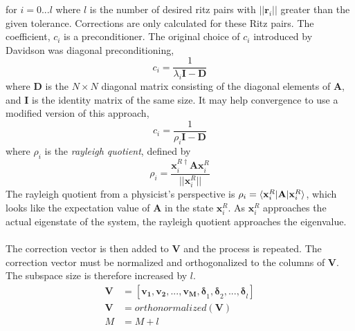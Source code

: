 \documentclass{revtex4}
\begin{document}
for $i =0...l$ where $l$ is the number of desired ritz pairs with $||\mathbf{r}_i||$ greater than the given tolerance. Corrections are only calculated for these Ritz pairs. The coefficient, $c_i$ is a preconditioner. The original choice of $c_i$ introduced by Davidson\cite{Davidson1975} was diagonal preconditioning, 
\begin{equation}
c_i = \frac{1}{\lambda_i\mathbf{I}-\mathbf{D}}
\end{equation}
where $\mathbf{D}$ is the $N\times N$ diagonal matrix consisting of the diagonal elements of $\mathbf{A}$, and $\mathbf{I}$ is the identity matrix of the same size. It may help convergence to use a modified version of this approach, 
\begin{equation}
c_i = \frac{1}{\rho_i\mathbf{I}-\mathbf{D}}
\end{equation}
where $\rho_i$ is the \emph{rayleigh quotient}, defined by
\begin{equation}
\rho_i = \frac{\mathbf{x}_i^{R\dag}\mathbf{A}\mathbf{x}_i^{R}}{||\mathbf{x}_i^{R}||}
\end{equation}
The rayleigh quotient from a physicist's perspective is $\rho_i = \braket{\mathbf{x}_i^{R}|\mathbf{A}|\mathbf{x}_i^{R}}$, which looks like the expectation value of $\mathbf{A}$ in the state $\mathbf{x}_i^{R}$. As $\mathbf{x}_i^{R}$ approaches the actual eigenstate of the system, the rayleigh quotient approaches the eigenvalue.
\\\\
The correction vector is then added to $\mathbf{V}$ and the process is repeated. The correction vector must be normalized and orthogonalized to the columns of $\mathbf{V}$. The subspace size is therefore increased by $l$. 
\begin{subequations}
\begin{align}
\mathbf{V} &= [\mathbf{v_1,v_2,...,v_M}\mathbf{,\delta}_1\mathbf{,\delta}_2,...\mathbf{,\delta}_l] \\
\mathbf{V} &= orthonormalized(\mathbf{V})\\
M &= M + l
\end{align}
\end{subequations}
\end{document}
